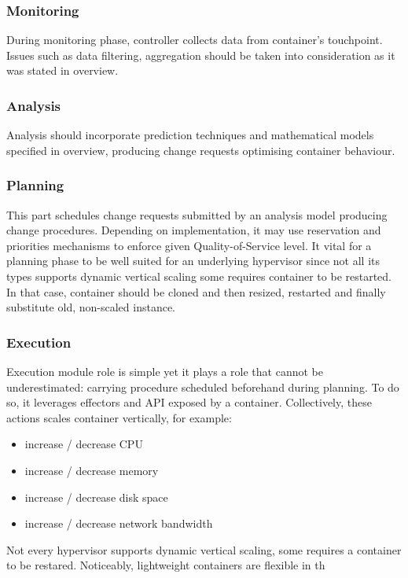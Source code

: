 \subsubsection{Monitoring}
During monitoring phase, controller collects data from container's touchpoint. Issues such as data filtering, aggregation should be taken into consideration as it was stated in overview. 

\subsubsection{Analysis}
Analysis should incorporate prediction techniques and mathematical models specified in overview, producing change requests optimising container behaviour.

\subsubsection{Planning}
This part schedules change requests submitted by an analysis model producing change procedures. Depending on implementation, it may use reservation and priorities mechanisms to enforce given Quality-of-Service level. It vital for a planning phase to be well suited for an underlying hypervisor since not all its types supports dynamic vertical scaling some requires container to be restarted. In that case, container should be cloned and then resized, restarted and finally substitute old, non-scaled instance.

\subsubsection{Execution}
Execution module role is simple yet it plays a role that cannot be underestimated: carrying procedure scheduled beforehand during planning. To do so, it leverages effectors and API exposed by a container. Collectively, these actions scales container vertically, for example:
\begin{itemize}
 \item increase / decrease CPU
 \item increase / decrease memory
 \item increase / decrease disk space
 \item increase / decrease network bandwidth
\end{itemize}
Not every hypervisor supports dynamic vertical scaling, some requires a container to be restared. Noticeably, lightweight containers are flexible in th


